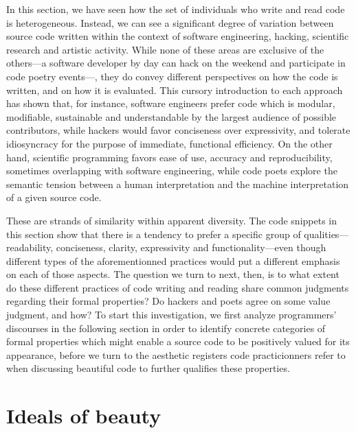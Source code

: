 In this section, we have seen how the set of individuals who write and read code is heterogeneous. Instead, we can see a significant degree of variation between source code written within the context of software engineering, hacking, scientific research and artistic activity. While none of these areas are exclusive of the others—a software developer by day can hack on the weekend and participate in code poetry events—, they do convey different perspectives on how the code is written, and on how it is evaluated. This cursory introduction to each approach has shown that, for instance, software engineers prefer code which is modular, modifiable, sustainable and understandable by the largest audience of possible contributors, while hackers would favor conciseness over expressivity, and tolerate idiosyncracy for the purpose of immediate, functional efficiency. On the other hand, scientific programming favors ease of use, accuracy and reproducibility, sometimes overlapping with software engineering, while code poets explore the semantic tension between a human interpretation and the machine interpretation of a given source code.

These are strands of similarity within apparent diversity. The code snippets in this section show that there is a tendency to prefer a specific group of qualities—readability, conciseness, clarity, expressivity and functionality—even though different types of the aforementionned practices would put a different emphasis on each of those aspects. The question we turn to next, then, is to what extent do these different practices of code writing and reading share common judgments regarding their formal properties? Do hackers and poets agree on some value judgment, and how? To start this investigation, we first analyze programmers' discourses in the following section in order to identify concrete categories of formal properties which might enable a source code to be positively valued for its appearance, before we turn to the aesthetic registers code practicionners refer to when discussing beautiful code to further qualifies these properties.

\pagebreak

\section{Ideals of beauty}
\label{sec:ideals-beauty}

